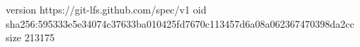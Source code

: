 version https://git-lfs.github.com/spec/v1
oid sha256:595333e5e34074c37633ba010425fd7670c113457d6a08a062367470398da2cc
size 213175
